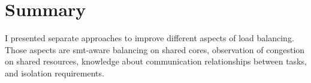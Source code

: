\section{Summary}
\label{state:summary}

\begin{comment}
After I introduce the reader to relevant terminology, I present related
research about symbiotic \gls{smt} co-schedules and the problem of accurately
measuring the performance of a specific co-schedule.
The prime are of application for load balancing is resource congestion. Research by
\citeauthor{knauerhase_using_2008}, \citeauthor{banikazemi_pam_2008}, and
\citeauthor{zhuravlev_addressing_2012} shows that separating application
competing for cache and memory decreases and stabilises their execution times.
The research presents \gls{llc} misses of an application as indicator for
memory usage and stress put on the memory subsystem.

\cite{hofmeyr_load_2010} balances a single application with several threads.
When all threads reach a synchronization barrier and they communicate their
results.
Hence, the slowest thread lets all other threads wait.
The authors develop a model to provide each thread with equal progress
opportunity.
The knowledge of this communication relationship determines the decision of
the load balancer.

Computations are reflected in cache usage of an application.
PRIME+PROBE attacks analyse the usage of cache lines of the targeted
application and can rebuild a cryptographic secret from the observations.
Placing security critical tasks on other cores than possible attackers, reduces
the amount of cache shared, hence raises the bar for an attack.
\\

In difference to the related work, the goal in this thesis is to design and
implement a load balancer, which mainly uses online measurements to decide on a
thread-to-core mapping.
Also, it should consider communication relationships and security requirements.
While previous research uses \gls{cmp} style processors, I use a \gls{smp} type
processor.
\Gls{cmp} is more similar to a multi-socket system, due to the separated
\gls{llc} between two processors on one die.
\end{comment}

I presented separate approaches to improve different aspects of load balancing.
Those aspects are \gls{smt}-aware balancing on shared cores, observation of
congestion on shared resources, knowledge about communication relationships
between tasks, and isolation requirements.

